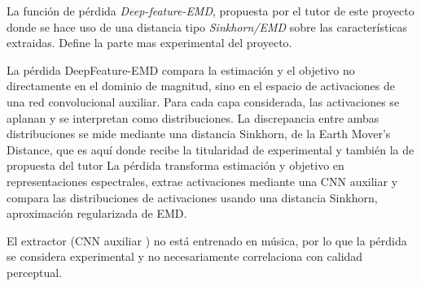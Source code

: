 La función de pérdida \textit{Deep-feature-EMD}, propuesta por el tutor de este proyecto donde se hace uso de una distancia tipo \textit{Sinkhorn/EMD} sobre las características extraidas. Define la parte mas experimental del proyecto.

La pérdida DeepFeature-EMD compara la estimación y el objetivo no directamente en el dominio de magnitud, sino en el espacio de activaciones de una red convolucional auxiliar. Para cada capa considerada, las activaciones se aplanan y se interpretan como distribuciones\cite{DeepLearningforChestRadiographs}. La discrepancia entre ambas distribuciones se mide mediante una distancia Sinkhorn,  de la Earth Mover’s Distance, que es aquí donde recibe la titularidad de experimental y también la de propuesta del tutor
La pérdida transforma estimación y objetivo en representaciones espectrales,
extrae activaciones mediante una CNN auxiliar y compara las distribuciones de
activaciones usando una distancia Sinkhorn, aproximación regularizada de EMD.

El extractor (CNN auxiliar ) no está entrenado en música, por lo que la pérdida se considera experimental y no necesariamente correlaciona con calidad perceptual.